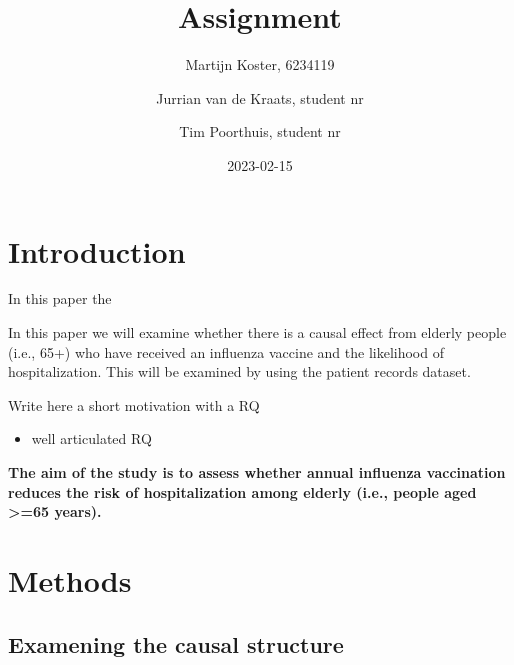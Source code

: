 \documentclass[
]{article}
\title{Assignment}
\author{Martijn Koster, 6234119 \and Jurrian van de Kraats, student nr \and Tim Poorthuis, student nr}
\date{2023-02-15}
\providecommand{\tightlist}{%
  \setlength{\itemsep}{0pt}\setlength{\parskip}{0pt}}
\begin{document}
\maketitle

\newpage

\hypertarget{introduction}{%
\section{Introduction}\label{introduction}}

In this paper the

In this paper we will examine whether there is a causal effect from elderly people (i.e., 65+) who have received an influenza vaccine and the likelihood of hospitalization. This will be examined by using the patient records dataset.

Write here a short motivation with a RQ

\begin{itemize}
\tightlist
\item
  well articulated RQ
\end{itemize}

\textbf{The aim of the study is to assess whether annual influenza vaccination reduces the risk of hospitalization among elderly (i.e., people aged \textgreater=65 years).}

\hypertarget{methods}{%
\section{Methods}\label{methods}}

\hypertarget{examening-the-causal-structure}{%
\subsection{Examening the causal structure}\label{examening-the-causal-structure}}
\end{document}
